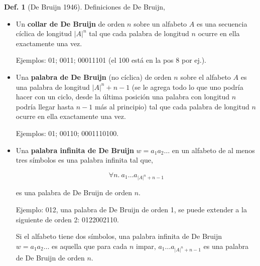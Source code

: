 \documentclass{report}
\theoremstyle{definition} %
\newtheorem{definition}{Def.}[chapter]
\begin{document}
\begin{definition}[De Bruijn 1946]
    Definiciones de De Bruijn,
    \begin{itemize}
        \item Un \textbf{collar de De Bruijn} de orden $n$ sobre un alfabeto $A$
        es una secuencia cíclica de longitud $|A|^n$ tal que cada palabra de
        longitud $n$ ocurre en ella exactamente una vez.

        Ejemplos: 01; 0011; 00011101 (el 100 está en la pos 8 por ej.).

        \item Una \textbf{palabra de De Bruijn} (no cíclica) de orden $n$ sobre
        el alfabeto $A$ es una palabra de longitud $|A|^n + n - 1$ (se le agrega
        todo lo que uno podría hacer con un ciclo, desde la última posición una palabra con longitud $n$ podría llegar hasta $n-1$ más al principio) tal que cada palabra de
        longitud $n$ ocurre en ella exactamente una vez.

        Ejemplos: 01; 00110; 0001110100.

        \item Una \textbf{palabra infinita de De Bruijn} $w = a_1 a_2 \dots$ en
        un alfabeto de al menos tres símbolos es una palabra infinita tal que,

        $$\forall{n}.\ a_1\dots a_{|A|^n + n - 1}$$

        es una palabra de De Bruijn de orden $n$.

        Ejemplo: 012, una palabra de De Bruijn de orden 1, se puede extender a
        la siguiente de orden 2: 0122002110.

        Si el alfabeto tiene dos símbolos, una palabra infinita de De Bruijn $w
        = a_1 a_2 \dots$ es aquella que para cada $n$ impar, $a_1\dots a_{|A|^n
        + n - 1}$ es una palabra de De Bruijn de orden $n$.
    \end{itemize}
\end{definition}
\end{document}
